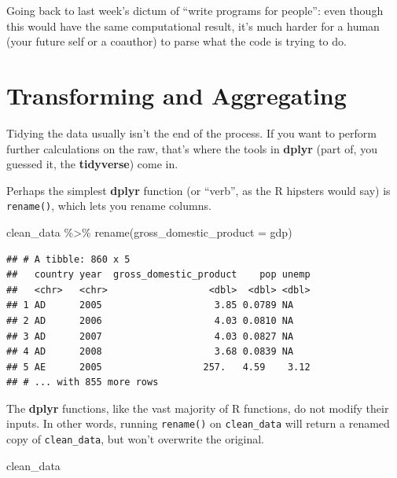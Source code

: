 \documentclass[
  12pt,
  oneside,openany]{book}
\newenvironment{Shaded}{\begin{snugshade}}{\end{snugshade}}
\newcommand{\AttributeTok}[1]{\textcolor[rgb]{0.77,0.63,0.00}{#1}}
\newcommand{\FunctionTok}[1]{\textcolor[rgb]{0.00,0.00,0.00}{#1}}
\newcommand{\NormalTok}[1]{#1}
\newcommand{\SpecialCharTok}[1]{\textcolor[rgb]{0.00,0.00,0.00}{#1}}
\begin{document}
Going back to last week's dictum of ``write programs for people'': even though this would have the same computational result, it's much harder for a human (your future self or a coauthor) to parse what the code is trying to do.

\hypertarget{transforming-and-aggregating}{%
\section{Transforming and Aggregating}\label{transforming-and-aggregating}}

Tidying the data usually isn't the end of the process. If you want to perform further calculations on the raw, that's where the tools in \textbf{dplyr} (part of, you guessed it, the \textbf{tidyverse}) come in.

Perhaps the simplest \textbf{dplyr} function (or ``verb'', as the R hipsters would say) is \texttt{rename()}, which lets you rename columns.

\begin{Shaded}
\begin{Highlighting}[]
\NormalTok{clean\_data }\SpecialCharTok{\%\textgreater{}\%}
  \FunctionTok{rename}\NormalTok{(}\AttributeTok{gross\_domestic\_product =}\NormalTok{ gdp)}
\end{Highlighting}
\end{Shaded}

\begin{verbatim}
## # A tibble: 860 x 5
##   country year  gross_domestic_product    pop unemp
##   <chr>   <chr>                  <dbl>  <dbl> <dbl>
## 1 AD      2005                    3.85 0.0789 NA   
## 2 AD      2006                    4.03 0.0810 NA   
## 3 AD      2007                    4.03 0.0827 NA   
## 4 AD      2008                    3.68 0.0839 NA   
## 5 AE      2005                  257.   4.59    3.12
## # ... with 855 more rows
\end{verbatim}

The \textbf{dplyr} functions, like the vast majority of R functions, do not modify their inputs. In other words, running \texttt{rename()} on \texttt{clean\_data} will return a renamed copy of \texttt{clean\_data}, but won't overwrite the original.

\begin{Shaded}
\begin{Highlighting}[]
\NormalTok{clean\_data}
\end{Highlighting}
\end{Shaded}
\end{document}

